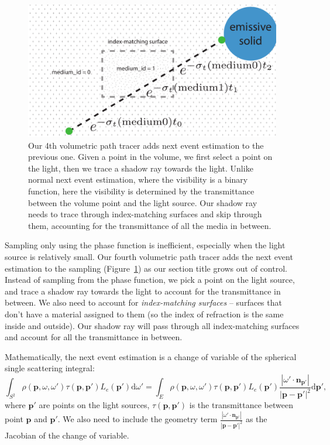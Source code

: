 \begin{figure}
\includegraphics[width=\linewidth]{imgs/volume_next_event_estimation.pdf}
\caption{Our 4th volumetric path tracer adds next event estimation to the previous one. Given a point in the volume, we first select a point on the light, then we trace a shadow ray towards the light. Unlike normal next event estimation, where the visibility is a binary function, here the visibility is determined by the transmittance between the volume point and the light source. Our shadow ray needs to trace through index-matching surfaces and skip through them, accounting for the transmittance of all the media in between.}
\label{fig:volpath4_illustration}
\end{figure}

Sampling only using the phase function is inefficient, especially when the light source is relatively small. Our fourth volumetric path tracer adds the next event estimation to the sampling (Figure~\ref{fig:volpath4_illustration}) as our section title grows out of control. Instead of sampling from the phase function, we pick a point on the light source, and trace a shadow ray towards the light to account for the transmittance in between. We also need to account for \emph{index-matching surfaces} -- surfaces that don't have a material assigned to them (so the index of refraction is the same inside and outside). Our shadow ray will pass through all index-matching surfaces and account for all the transmittance in between.

Mathematically, the next event estimation is a change of variable of the spherical single scattering integral:
\begin{equation}
\int_{S^2} \rho(\mathbf{p}, \omega, \omega') \tau(\mathbf{p}, \mathbf{p}') L_e(\mathbf{p}') \mathrm{d} \omega' =
\int_{E} \rho(\mathbf{p}, \omega, \omega') \tau(\mathbf{p}, \mathbf{p}') L_e(\mathbf{p}') \frac{\left|\omega' \cdot \mathbf{n}_{\mathbf{p}'}\right|}{\left|\mathbf{p} - \mathbf{p}'\right|^2} \mathrm{d} \mathbf{p}',
\end{equation}
where $\mathbf{p}'$ are points on the light sources, $\tau(\mathbf{p}, \mathbf{p}')$ is the transmittance between point $\mathbf{p}$ and $\mathbf{p}'$. We also need to include the geometry term $\frac{\left|\omega' \cdot \mathbf{n}_{\mathbf{p}'}\right|}{\left|\mathbf{p} - \mathbf{p}'\right|^2}$ as the Jacobian of the change of variable.

